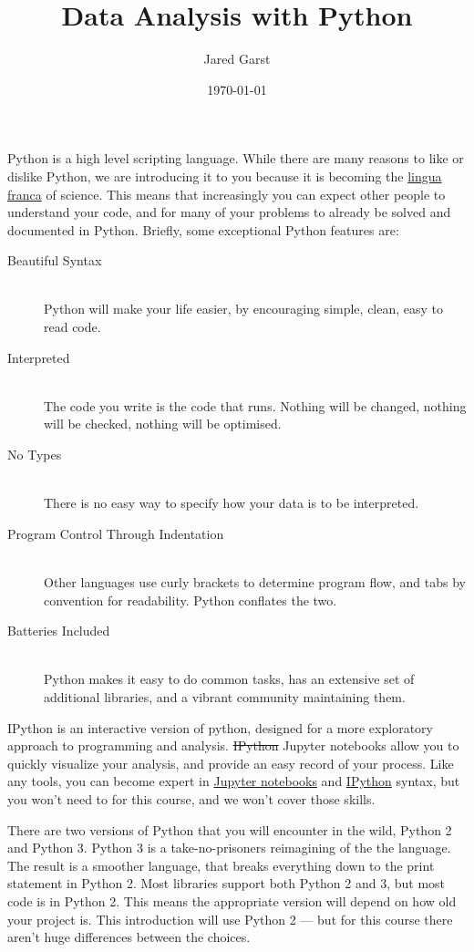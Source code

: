 \documentclass[justified, nobib]{tufte-handout}
\title{Data Analysis with Python}
\author{Jared Garst}
\date{\today} %
\newcommand{\ipythonTutorialLink}
  {http://ipython.readthedocs.org/en/stable/interactive/index.html}
\newcommand{\jupyterInfoLink}
  {http://jupyter-notebook.readthedocs.org/en/latest/notebook.html\#basic-workflow}
\newcommand{\linguaFrancaLink}{http://en.wikipedia.org/wiki/Lingua_franca}
\begin{document}
\maketitle
\bigskip

\noindent
Python is a high level scripting language. While there are many reasons to like
or dislike Python, we are introducing it to you because it is becoming the
\href{\linguaFrancaLink}{lingua franca} of
science. This means that increasingly you can expect other people to understand
your code, and for many of your problems to already be solved and documented in
Python. Briefly, some exceptional Python features are:

\begin{description}
\item[Beautiful Syntax] \hfill \\
  Python will make your life easier, by encouraging simple, clean, easy to read
  code.
\item[Interpreted] \hfill \\
  The code you write is the code that runs. Nothing will be changed, nothing
  will be checked, nothing will be optimised.
\item[No Types] \hfill \\
  There is no easy way to specify how your data is to be interpreted.
\item[Program Control Through Indentation] \hfill \\
  Other languages use curly brackets \ipythoninline{{}} to determine program
  flow, and tabs by convention for readability.
  Python conflates the two.
\item[Batteries Included] \hfill \\
  Python makes it easy to do common tasks, has an extensive set of additional
  libraries, and a vibrant community maintaining them.
\end{description}

\noindent
IPython is an interactive version of python, designed for a more exploratory
approach to programming and analysis.
\sout{IPython} Jupyter notebooks allow you to quickly visualize your analysis,
and provide an easy record of your process.
Like any tools, you can become expert in
\href{\jupyterInfoLink}{Jupyter notebooks} and
\href{\ipythonTutorialLink}{IPython} syntax, but you won't need to for this
course, and we won't cover those skills.

\smallskip
\noindent
There are two versions of Python that you will encounter in the wild, Python 2
and Python 3. Python 3 is a take-no-prisoners reimagining of the the
language.
The result is a smoother language, that breaks everything down to the print
statement in Python 2.
Most libraries support both Python 2 and 3, but most code is in Python 2.
This means the appropriate version will depend on how old your project is.
This introduction will use Python 2 --- but for this course there aren't huge
differences between the choices.
\end{document}
